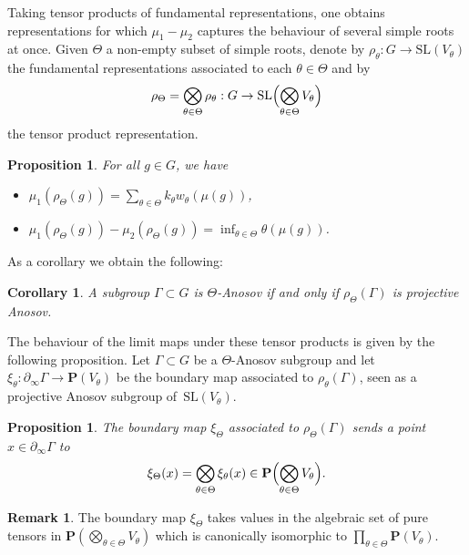 \documentclass[11pt]{article}
\numberwithin{equation}{section}
\newtheorem{coro}[theo]{Corollary}
\newtheorem{prop}[theo]{Proposition}
\theoremstyle{definition}
\newtheorem{rmk}[theo]{Remark}
\newcommand{\proj}{\mathbf{P}}
\newcommand{\SL}{\mathrm{SL}}
\let\G\Gamma
\begin{document}
Taking tensor products of fundamental representations, one obtains representations for which $\mu_1- \mu_2$ captures the behaviour of several simple roots at once. Given $\Theta$ a non-empty subset of simple roots, denote by $\rho_\theta: G \to \SL(V_\theta)$ the fundamental representations associated to each $\theta\in \Theta$ and by
\[\rho_\Theta = \bigotimes_{\theta \in \Theta} \rho_\theta : G \to \SL\Bigl( \bigotimes_{\theta \in \Theta} V_\theta\Bigr)\]
the tensor product representation.

\begin{prop} \label{prop - SimpleRootsTensorProduct}
For all $g\in G$, we have
\begin{itemize}
\item $\mu_1(\rho_\Theta(g)) = \sum_{\theta \in \Theta} k_\theta w_\theta(\mu(g))$,
\item $\mu_1(\rho_\Theta(g)) - \mu_2(\rho_\Theta(g)) = \inf_{\theta\in \Theta} \theta(\mu(g))$.
\end{itemize}
\end{prop}

As a corollary we obtain the following:
\begin{coro} \label{coro - anosov is projective anosov}
A subgroup $\G\subset G$ is $\Theta$-Anosov if and only if $\rho_\Theta(\G)$ is projective Anosov.
\end{coro}

The behaviour of the limit maps under these tensor products is given by the following proposition. Let $\G \subset G$ be a $\Theta$-Anosov subgroup and let $\xi_\theta: \partial_\infty \Gamma \to \proj(V_\theta)$ be the boundary map associated to $\rho_\theta(\G)$, seen as a projective Anosov subgroup of~$\SL(V_\theta)$.

\begin{prop} \label{prop - boundary map tensor product}
The boundary map $\xi_\Theta$ associated to $\rho_\Theta(\G)$ sends a point $x\in \partial_\infty \G$ to
\[\xi_\Theta(x) = \bigotimes_{\theta\in \Theta} \xi_\theta(x) \in \proj\Bigl(\bigotimes_{\theta\in \Theta} V_\theta\Bigr).\]
\end{prop}

\begin{rmk}
The boundary map $\xi_\Theta$ takes values in the algebraic set of pure tensors in $\proj\left(\bigotimes_{\theta\in \Theta} V_\theta\right)$ which is canonically isomorphic to $\prod_{\theta \in \Theta} \proj (V_\theta)$.
\end{rmk}
\end{document}
